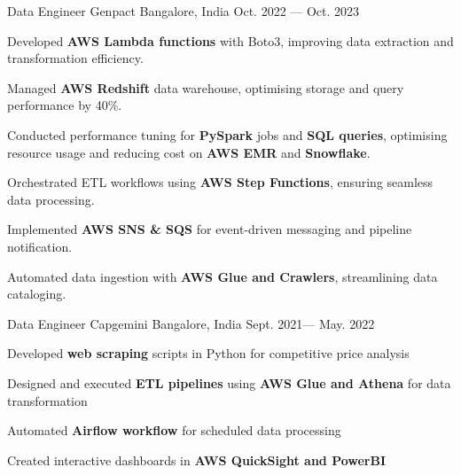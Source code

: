 \begin{cventries}
\cventry
{Data Engineer}
{\fontsize{10pt}{1em}\bodyfont\upshape\color{futurepurple} Genpact}
{Bangalore, India}
{Oct. 2022 --- Oct. 2023}
{
  \begin{cvitems}
    \item {Developed \textbf{AWS Lambda functions} with Boto3, improving data extraction and transformation efficiency.}
    \item {Managed \textbf{AWS Redshift} data warehouse, optimising storage and query performance by 40\%.}
    \item {Conducted performance tuning for \textbf{PySpark} jobs and \textbf{SQL queries}, optimising resource usage and reducing cost on \textbf{AWS EMR} and \textbf{Snowflake}.}
    \item {Orchestrated ETL workflows using \textbf{AWS Step Functions}, ensuring seamless data processing.}
    \item {Implemented \textbf{AWS SNS \& SQS} for event-driven messaging and pipeline notification.}
    \item {Automated data ingestion with \textbf{AWS Glue and Crawlers}, streamlining data cataloging.}
  \end{cvitems}
}
  \cventry
  {Data Engineer} %
  {\fontsize{10pt}{1em}\bodyfont\upshape\color{futurepurple} Capgemini} %
  {Bangalore, India} %
  {Sept. 2021--- May. 2022} %
  {
    \begin{cvitems} %
    \item {Developed \textbf{web scraping} scripts in Python for competitive price analysis}
    \item {Designed and executed \textbf{ETL pipelines} using \textbf{AWS Glue and Athena} for data transformation}
    \item {Automated \textbf{Airflow workflow} for scheduled data processing}
    \item {Created interactive dashboards in \textbf{AWS QuickSight and PowerBI}}
    \end{cvitems}
  }


\end{cventries}
